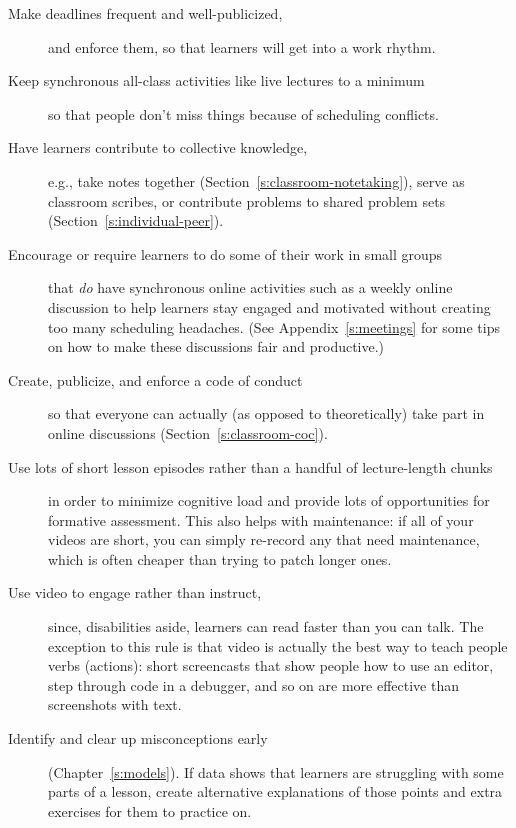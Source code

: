 \begin{description}
\item[Make deadlines frequent and well-publicized,]
and enforce them, so that learners will get into a work rhythm.
\item[Keep synchronous all-class activities like live lectures to a minimum]
so that people don't miss things because of scheduling conflicts.
\item[Have learners contribute to collective knowledge,]
e.g., take notes together (Section~\ref{s:classroom-notetaking}),
serve as classroom scribes, or contribute problems to shared problem
sets (Section~\ref{s:individual-peer}).
\item[Encourage or require learners to do some of their work in small groups]
that \emph{do} have synchronous online activities such as a weekly online
discussion to help learners stay engaged and motivated without
creating too many scheduling headaches. (See
Appendix~\ref{s:meetings} for some tips on how to make these
discussions fair and productive.)
\item[Create, publicize, and enforce a code of conduct]
so that everyone can actually (as opposed to theoretically) take
part in online discussions (Section~\ref{s:classroom-coc}).
\item[Use lots of short lesson episodes rather than a handful of lecture-length chunks]
in order to minimize cognitive load and provide lots of
opportunities for formative assessment. This also helps with
maintenance: if all of your videos are short, you can simply
re-record any that need maintenance, which is often cheaper than
trying to patch longer ones.
\item[Use video to engage rather than instruct,]
since, disabilities aside, learners can read faster than you can
talk. The exception to this rule is that video is actually the best
way to teach people verbs (actions): short screencasts that show
people how to use an editor, step through code in a debugger, and so
on are more effective than screenshots with text.
\item[Identify and clear up misconceptions early]
(Chapter~\ref{s:models}). If data shows that learners are struggling
with some parts of a lesson, create alternative explanations of
those points and extra exercises for them to practice on.
\end{description}

